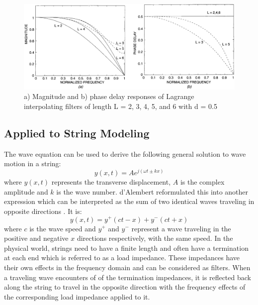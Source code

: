 \documentclass[main.tex]{subfiles}
\begin{document}
\begin{figure}[h]
    \centering
    \includegraphics[scale=.65]{./images/plots/LagrangeResponses.png}
    \caption{a) Magnitude and b) phase delay responses of Lagrange interpolating filters of length L = 2, 3, 4, 5, and 6 with d = 0.5 }
    \label{fig:LagrangeResponses}
\end{figure}

\subsection{Applied to String Modeling}
The wave equation can be used to derive the following general solution to wave motion in a string:
\begin{equation}
    y(x,t) = Ae^{j\left(\omega t \pm k x\right)}
\end{equation}
where $y(x,t)$ represents the transverse displacement, $A$ is the complex amplitude and $k$ is the wave number. d'Alembert reformulated this into another expression which can be interpreted as the sum of two identical waves traveling in opposite directions . It is:
\begin{equation}
    y(x,t) = y^{+}(ct - x) + y^{-}(ct + x)
\end{equation}
where $c$ is the wave speed and $y^+$ and $y^-$ represent a wave traveling in the positive and negative $x$ directions respectively, with the same speed. In the physical world, strings need to have a finite length and often have a termination at each end which is referred to as a load impedance. These impedances have their own effects in the frequency domain and can be considered as filters. When a traveling wave encounters of of the termination impedances, it is reflected back along the string to travel in the opposite direction with the frequency effects of the corresponding load impedance applied to it. 
\end{document}
